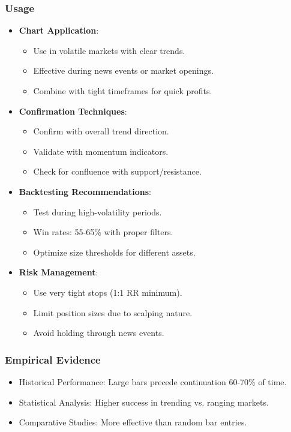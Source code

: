 \documentclass[12pt]{article}
\begin{document}
\subsubsection{Usage}
\begin{itemize}
\item \textbf{Chart Application}:
  \begin{itemize}
  \item Use in volatile markets with clear trends.
  \item Effective during news events or market openings.
  \item Combine with tight timeframes for quick profits.
  \end{itemize}
\item \textbf{Confirmation Techniques}:
  \begin{itemize}
  \item Confirm with overall trend direction.
  \item Validate with momentum indicators.
  \item Check for confluence with support/resistance.
  \end{itemize}
\item \textbf{Backtesting Recommendations}:
  \begin{itemize}
  \item Test during high-volatility periods.
  \item Win rates: 55-65\% with proper filters.
  \item Optimize size thresholds for different assets.
  \end{itemize}
\item \textbf{Risk Management}:
  \begin{itemize}
  \item Use very tight stops (1:1 RR minimum).
  \item Limit position sizes due to scalping nature.
  \item Avoid holding through news events.
  \end{itemize}
\end{itemize}

\subsubsection{Empirical Evidence}
\begin{itemize}
\item Historical Performance: Large bars precede continuation 60-70\% of time.
\item Statistical Analysis: Higher success in trending vs. ranging markets.
\item Comparative Studies: More effective than random bar entries.
\end{itemize}
\end{document}

